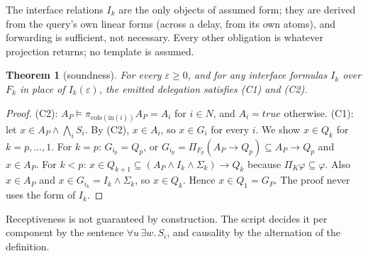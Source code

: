 \documentclass[11pt]{article}
\newtheorem{theorem}{Theorem}
\theoremstyle{definition}
\theoremstyle{remark}
\newcommand{\cols}{\mathrm{cols}}
\newcommand{\inp}{\mathrm{in}}
\newcommand{\eps}{\varepsilon}
\begin{document}
The interface relations $I_k$ are the only objects of assumed form; they are derived from the query's own linear forms (across a delay, from its own atoms), and forwarding is sufficient, not necessary.
Every other obligation is whatever projection returns; no template is assumed.

\begin{theorem}[soundness]\label{thm:sound}
For every $\eps\ge0$, and for any interface formulas $I_k$ over $F_k$ in place of $I_k(\eps)$, the emitted delegation satisfies (C1) and (C2).
\end{theorem}
\begin{proof}
(C2): $A_P\models\pi_{\cols(\inp(i))}A_P=A_i$ for $i\in N$, and $A_i=\mathit{true}$ otherwise.
(C1): let $x\in A_P\wedge\bigwedge_iS_i$. By (C2), $x\in A_i$, so $x\in G_i$ for every $i$.
We show $x\in Q_k$ for $k=p,\dots,1$.
For $k=p$: $G_{i_p}=Q_p$, or $G_{i_p}=\Pi_{F_p}(A_P\to Q_p)\subseteq A_P\to Q_p$ and $x\in A_P$.
For $k<p$: $x\in Q_{k+1}\subseteq(A_P\wedge I_k\wedge\Sigma_k)\to Q_k$ because $\Pi_K\varphi\subseteq\varphi$.
Also $x\in A_P$ and $x\in G_{i_k}=I_k\wedge\Sigma_k$, so $x\in Q_k$.
Hence $x\in Q_1=G_P$. The proof never uses the form of $I_k$.
\end{proof}
Receptiveness is not guaranteed by construction. The script decides it per component by the sentence $\forall u\,\exists w.\,S_i$, and causality by the alternation of the definition.
\end{document}

